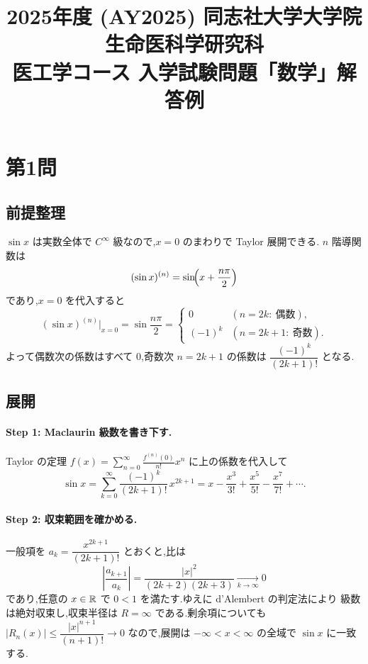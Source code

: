 \documentclass[11pt,a4paper]{article}
\title{2025年度 (AY2025) 同志社大学大学院 生命医科学研究科\\
医工学コース 入学試験問題「数学」解答例}
\author{}
\date{}
\begin{document}
\maketitle
\vspace{-3em}

\section*{第1問}

\subsection*{前提整理}

$\sin x$ は実数全体で $C^\infty$ 級なので,$x=0$ のまわりで Taylor 展開できる.
$n$ 階導関数は
\[
(\sin x)^{(n)}=\sin\!\Bigl(x+\frac{n\pi}{2}\Bigr)
\]
であり,$x=0$ を代入すると
\[
(\sin x)^{(n)}\Big|_{x=0}=\sin\frac{n\pi}{2}
=\begin{cases}
0 & (n=2k:\ \text{偶数}),\\[2pt]
(-1)^{k} & (n=2k+1:\ \text{奇数}).
\end{cases}
\]
よって偶数次の係数はすべて $0$,奇数次 $n=2k+1$ の係数は
$\dfrac{(-1)^k}{(2k+1)!}$ となる.

\subsection*{展開}

\paragraph{Step 1: Maclaurin 級数を書き下す.}
Taylor の定理 $f(x)=\sum_{n=0}^{\infty}\frac{f^{(n)}(0)}{n!}x^{n}$ に上の係数を代入して
\[
\sin x=\sum_{k=0}^{\infty}\frac{(-1)^{k}}{(2k+1)!}\,x^{2k+1}
=x-\frac{x^{3}}{3!}+\frac{x^{5}}{5!}-\frac{x^{7}}{7!}+\cdots.
\]

\paragraph{Step 2: 収束範囲を確かめる.}
一般項を $a_k=\dfrac{x^{2k+1}}{(2k+1)!}$ とおくと,比は
\[
\left|\frac{a_{k+1}}{a_k}\right|
=\frac{|x|^{2}}{(2k+2)(2k+3)}\xrightarrow[k\to\infty]{}0
\]
であり,任意の $x\in\mathbb{R}$ で $0<1$ を満たす.ゆえに d'Alembert の判定法により
級数は絶対収束し,収束半径は $R=\infty$ である.剰余項についても
$|R_n(x)|\le\dfrac{|x|^{n+1}}{(n+1)!}\to0$ なので,展開は $-\infty<x<\infty$ の全域で
$\sin x$ に一致する.
\end{document}
